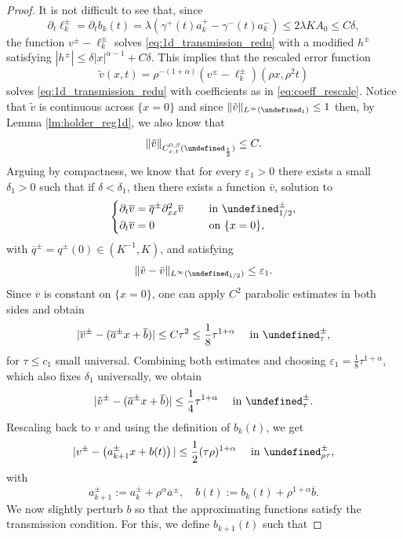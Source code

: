 \documentclass[12pt]{article}
\let\P\undefined
\numberwithin{Theorem}{section}
\theoremstyle{definition}
\theoremstyle{remark}
\numberwithin{equation}{section}
\newcommand{\p}{\partial}
\newcommand{\P}{\mathcal{P}}
\begin{document}
\begin{proof}
It is not difficult to see that, since 
\[
\p_t \ell_k^\pm = \p_t b_k(t) = \lambda \left( \gamma^{+}(t) a_k^+ - \gamma^{-}(t) a_k^- \right) \leq 2\lambda K A_0 \leq C\delta,
\]
the function $v^\pm - \ell_k^\pm$ solves \eqref{eq:1d_transmission_redu} with a modified $h^{\pm}$ satisfying $|h^{\pm}| \leq \delta |x|^{{ \alpha}-1}+ C\delta$. This implies that the rescaled error function
\begin{equation} \label{eq:def_v_tilde}
\tilde v(x,t) = \rho^{-(1+{ \alpha})} (v^\pm-\ell_k^\pm)(\rho x,\rho^2 t)
\end{equation}
solves  \eqref{eq:1d_transmission_redu} with coefficients as in \eqref{eq:coeff_rescale}. Notice that $\tilde v$ is continuous across $\{x=0 \}$ and since $\| \tilde  v\|_{L^{\infty}(\P_1)} \leq 1$ then, by Lemma \ref{lm:holder_reg1d}, we also know that 
\[
 \| \tilde v\|_{C_{x,t}^{0,\beta}(\P_{\frac{1}{2}})} \leq C.
\]
Arguing by compactness, we know that for every $\varepsilon_1>0$ there exists a small $\delta_1>0$ such that if $\delta<\delta_1$, then there exists a function $\bar v$, solution to
\begin{equation} \label{eq:1d_transmission_redu_limit}
    \begin{cases}
\p_t \overline{v} = \overline{q}^{\pm} \p_{xx}^2 \overline{v} \quad &\text{ in } \P_{1/2}^\pm, \\
        \p_t \overline{v}= 0  \quad &\text{ on } \{x= 0 \},
    \end{cases}
\end{equation}
with $\overline{q}^\pm=q^\pm(0) \in (K^{-1},K)$, and satisfying
\[
\|\tilde v-\bar v\|_{L^\infty(\P_{1/2})}\leq \varepsilon_1.
\]
Since $\overline{v}$ is constant on $\{x=0 \}$, one can apply $C^2$ parabolic estimates in both sides and obtain
\[
|\overline{v}^{\pm} - (\overline{a}^\pm x + \overline{b}) |\leq C \tau^{2} \leq \frac{1}{8} \tau^{1+{ \alpha}}    \quad \text{ in } \P_{\tau}^{\pm},
\]
for $\tau \leq c_1$ small universal. Combining both estimates and choosing $\varepsilon_1=\frac{1}{8} \tau^{1+{ \alpha}}$, which also fixes $\delta_1$ universally, we obtain
\[
|\tilde v^\pm - (\overline{a}^\pm x + \overline{b}) | \leq \frac{1}{4} \tau^{1+{ \alpha}}    \quad \text{ in } \P_{\tau}^{\pm}.
\]
Rescaling back to $v$ and using the definition of $b_k(t)$, we get 
\[
|v^{\pm} - \left(a_{k+1}^\pm x +b(t) \right)| \leq \frac{1}{2} (\tau \rho)^{1+{ \alpha}}    \quad \text{ in } \P_{\rho\tau}^{\pm}, 
\]
with
\[
a_{k+1}^\pm := a_k^\pm + \rho^{{ \alpha}} \overline{a}^\pm, \quad b(t) := b_k(t)+ \rho^{1+{ \alpha}} \overline{b}.
\]
We now slightly perturb $b$ so that the approximating functions satisfy the transmission condition. For this, we define $b_{k+1}(t)$ such that

\end{proof}
\end{document}
